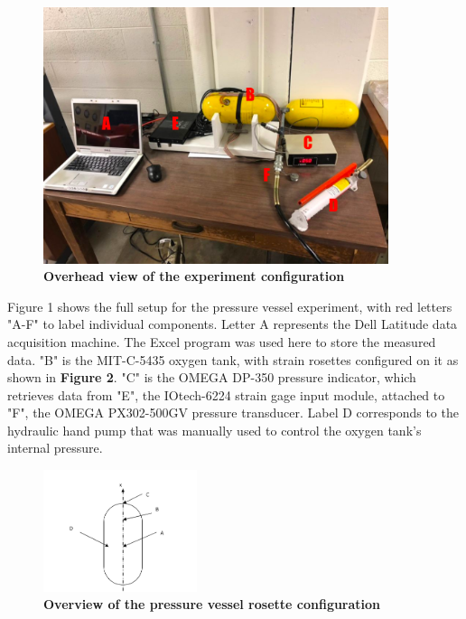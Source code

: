 \documentclass{article}
\begin{document}
\begin{figure} [H]
	\centering
	\includegraphics[width=0.9\textwidth]{setup}
	\caption{\textbf{Overhead view of the experiment configuration}}
\end{figure}
Figure 1 shows the full setup for the pressure vessel experiment, with red letters "A-F" to 
label individual components. Letter A represents the Dell Latitude data acquisition machine. The
Excel program was used here to store the measured data. "B" is the MIT-C-5435 oxygen tank, with 
strain rosettes configured on it as shown in \textbf{Figure 2}. "C" is the OMEGA DP-350 pressure
indicator, which retrieves data from "E", the IOtech-6224 strain gage input module, attached to
"F", the OMEGA PX302-500GV pressure transducer. Label D corresponds to the hydraulic hand pump 
that was manually used to control the oxygen tank's internal pressure. 

\begin{figure} [H]
	\centering
	\includegraphics [width=0.4\textwidth]{vessel}
	\caption{\textbf{Overview of the pressure vessel rosette configuration}}
\end{figure} 
\end{document}
